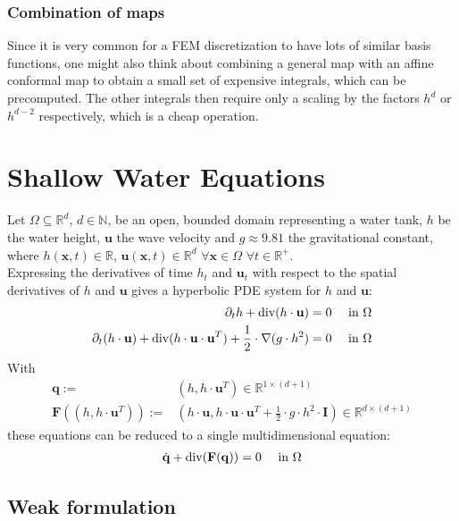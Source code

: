 \documentclass{IOS-Book-Article}
\theoremstyle{plain}
\theoremstyle{definition}
\DeclareMathOperator{\diverg}{div}
\begin{document}
\subsubsection{Combination of maps}

Since it is very common for a FEM discretization to have lots of similar basis functions, one might also think about combining a general map with an affine conformal map to obtain a small set of expensive integrals, which can be precomputed. The other integrals then require only a scaling by the factors $h^d$ or $h^{d-2}$ respectively, which is a cheap operation.

\newpage
\section{Shallow Water Equations}

Let $\Omega \subseteq \mathbb{R}^d$, $d \in \mathbb{N}$, be an open, bounded domain representing a water tank, $h$ be the water height, $\mathbf u$ the wave velocity and $g\approx 9.81$ the gravitational constant, where $h(\mathbf x, t) \in \mathbb{R}$, $\mathbf u(\mathbf x, t) \in \mathbb{R}^d$ $\forall \mathbf x \in \Omega$ $\forall t \in \mathbb{R}^{+}$.\\
Expressing the derivatives of time $h_t$ and $\mathbf u_t$ with respect to the spatial derivatives of $h$ and $\mathbf u$ gives a hyperbolic PDE system for $h$ and $\mathbf u$:
\begin{align}
	\partial_t h + \diverg (h \cdot \mathbf u) &= 0 & \textnormal{ in } \Omega \\
	\partial_t (h \cdot \mathbf u) + \diverg (h \cdot \mathbf u \cdot \mathbf u^T) + \frac{1}{2} \cdot \nabla (g \cdot h^2) &= 0 & \textnormal{ in } \Omega
\end{align}
With
\begin{align*}
\mathbf q :=& \left( h, h \cdot \mathbf u^T \right) \in \mathbb R^{1 \times (d+1)} \\
\mathbf F \left( \left( h, h \cdot \mathbf u^T \right) \right) :=& \left( h \cdot \mathbf u, h \cdot \mathbf u \cdot \mathbf u^T + \frac{1}{2} \cdot g \cdot h^2 \cdot \mathbf I \right) \in \mathbb R^{d \times (d+1)}
\end{align*}
these equations can be reduced to a single multidimensional equation:
\begin{align}
	\dot{\mathbf q} + \diverg (\mathbf F(\mathbf q)) &= 0 & \textnormal{ in } \Omega
\end{align}

\subsection{Weak formulation}
\end{document}
